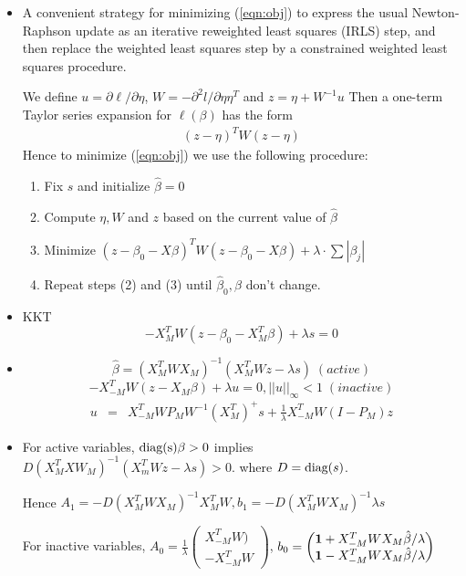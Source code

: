 \documentclass{article}
\def\be {{\bf 1}}
\begin{document}
\begin{itemize}
\item A convenient strategy for minimizing (\ref{eqn:obj}) to express the usual
Newton-Raphson update as an iterative reweighted least squares (IRLS) step, and then
replace the weighted least squares step by a constrained  weighted least squares
procedure.

We define $u= \partial\ell/\partial\eta$,
$W=-\partial^2 l/\partial\eta\eta^T$ and $z=\eta+W^{-1}u$
Then a one-term Taylor series expansion for $\ell(\beta)$  has the form
\begin{eqnarray}
(z-\eta)^T W(z-\eta)
\label{taylor}
\end{eqnarray}
Hence to  minimize (\ref{eqn:obj})  we use the following
 procedure:
\begin{enumerate}
\item Fix $s$ and initialize $\hat\beta=0$
\item Compute $\eta, W$ and $z$ based on the current value of $\hat\beta$
\item Minimize $(z-\beta_0-X\beta)^TW (z-\beta_0-X\beta)+\lambda\cdot\sum|\beta_j|$ 
\item Repeat steps (2) and (3) until $\hat\beta_0, \hat\beta$ don't change.
\end{enumerate}

\item  KKT
$$ -X_M^T W(z- \beta_0-X_M^T\beta)+\lambda s=0$$
\item
$$\hat\beta=(X_M^TW X_M)^{-1}(X_M^TW z-\lambda s) \;(active) $$
$$-X_{-M}^T  W (z-X_M\beta)+\lambda u =0,  ||u||_\infty <1 \;(inactive) $$
\begin{eqnarray}
u&=&X_{-M}^T  W P_MW^{-1}(X_M^T)^+s+ \frac{1}{\lambda} X_{-M}^T W(I-P_M)z
\end{eqnarray}

\item For active variables,
${\rm diag(s)}\beta>0$ implies
$D(X_M^TXW_M)^{-1}(X_m^TW z-\lambda s)>0$. 
where $D={\rm diag(}s)$.

Hence
$A_1=-D(X_M^TWX_M)^{-1}X_M^TW, b_1=-D(X_M^TWX_M)^{-1}\lambda s$

For inactive variables,
$A_0=\frac{1}{\lambda} 
\begin{pmatrix}
 X_{-M}^T W) \\
   -X_{-M}^T W
   \end{pmatrix}
   $, $b_0= \begin{pmatrix}
              \be+X_{-M}^TWX_M\hat\beta/\lambda \\
                 \be-X_{-M}^TWX_M\hat\beta/\lambda
              \end{pmatrix}
              $
              

\end{itemize}
\end{document}
